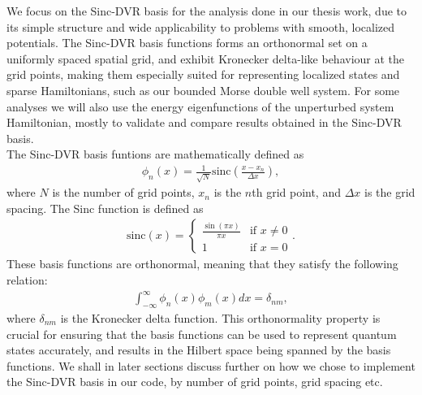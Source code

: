 \documentclass{subfiles}
\begin{document}
We focus on the Sinc-DVR basis \cite{colbert1992novel} for the analysis done in our thesis work, due to its simple structure and wide applicability to problems with smooth, localized potentials. The Sinc-DVR basis functions forms an orthonormal set on a uniformly spaced spatial grid, and exhibit Kronecker delta-like behaviour at the grid points, making them especially suited for representing localized states and sparse Hamiltonians, such as our bounded Morse double well system. For some analyses we will also use the energy eigenfunctions of the unperturbed system Hamiltonian, mostly to validate and compare results obtained in the Sinc-DVR basis.
\\ The Sinc-DVR basis funtions are mathematically defined as
\begin{align*}
    \phi_n(x) = \frac{1}{\sqrt{N}} \text{sinc}\left(\frac{x - x_n}{\Delta x}\right)\label{eq:sinc_dvr},
\end{align*}
where $N$ is the number of grid points, $x_n$ is the $n$th grid point, and $\Delta x$ is the grid spacing. The Sinc function is defined as
\begin{align*}
    \text{sinc}(x) = \begin{cases}
        \frac{\sin(\pi x)}{\pi x} & \text{if } x \neq 0 \\
        1 & \text{if } x = 0
    \end{cases}.
\end{align*}
These basis functions are orthonormal, meaning that they satisfy the following relation:
\begin{align*}
    \int_{-\infty}^{\infty} \phi_n(x) \phi_m(x) dx = \delta_{nm},
\end{align*}
where $\delta_{nm}$ is the Kronecker delta function. This orthonormality property is crucial for ensuring that the basis functions can be used to represent quantum states accurately, and results in the Hilbert space being spanned by the basis functions. We shall in later sections discuss further on how we chose to implement the Sinc-DVR basis in our code, by number of grid points, grid spacing etc. 
\end{document}

